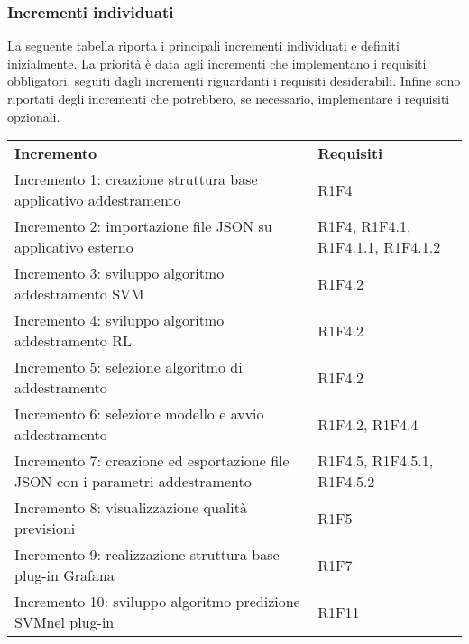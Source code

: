 \subsubsection{Incrementi individuati}
La seguente tabella riporta i principali incrementi individuati e definiti inizialmente. La priorità è data agli incrementi che implementano i requisiti obbligatori, seguiti dagli incrementi riguardanti i requisiti desiderabili. Infine sono riportati degli incrementi che potrebbero, se necessario, implementare i requisiti opzionali.
\begin{longtable} {
		>{\raggedright\arraybackslash}p{85mm}
		>{\raggedleft\arraybackslash}p{40mm}
	}
	\rowcolor{gray!50} 
	\textbf{Incremento} & 
	\textbf{Requisiti} 	\TBstrut \\
	
	Incremento 1: creazione struttura base applicativo addestramento &
	R1F4  \TBstrut \\ [2mm]		
	
	Incremento 2: importazione file JSON su applicativo esterno & 
	R1F4, R1F4.1, R1F4.1.1, R1F4.1.2  \TBstrut \\ [2mm]
	
	Incremento 3: sviluppo algoritmo addestramento SVM\glosp & 
	R1F4.2  \TBstrut \\ [2mm]
	
	Incremento 4: sviluppo algoritmo addestramento RL\glosp & 
	R1F4.2  \TBstrut \\ [2mm]
	
	Incremento 5: selezione algoritmo di addestramento & 
	R1F4.2  \TBstrut \\ [2mm]
	
	Incremento 6: selezione modello e avvio addestramento & 
	R1F4.2, R1F4.4 \TBstrut \\ [2mm]
	
	Incremento 7: creazione ed esportazione file JSON con i parametri addestramento &
	R1F4.5, R1F4.5.1, R1F4.5.2 \TBstrut \\ [2mm]
	
	Incremento 8: visualizzazione qualità previsioni &
	R1F5 \TBstrut \\ [2mm]
	
	Incremento 9: realizzazione struttura base plug-in Grafana\glosp &
	R1F7 \TBstrut \\ [2mm]
	
	Incremento 10: sviluppo algoritmo predizione SVM\glosp nel plug-in &
	R1F11 \TBstrut \\ [2mm]
	

\end{longtable}
